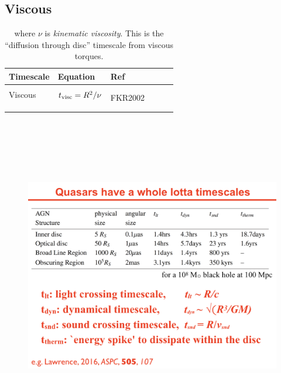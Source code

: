 \documentclass[11pt]{article}
\begin{document}
\subsection{Viscous}
\begin{table}
  \begin{center}
    \begin{tabular}{l l l l l l} 
      \hline
      \hline 
      Timescale           &                       Equation    &  Ref  \\
      \hline  
       &&& \\
       Viscous  &     $t_{\rm visc} = R^{2}/\nu$                                                 &  \multirow{3}{*}{FKR2002 }      \\
                  &     &  \\
              &   &  \\
        &&& \\
         \hline
         \hline 
       \end{tabular}
      \caption{where $\nu$ is {\it kinematic viscosity}. This is the ``diffusion through disc'' timescale from viscous torques.}
      \label{tab:lightcrossing}
    \end{center}
\end{table}



\begin{figure}
  \centering
  \includegraphics[width=18.00cm, height=14.00cm]{Lawrence_2016plus.png}
  \caption[]{} 
  \label{}
\end{figure}
\end{document}
